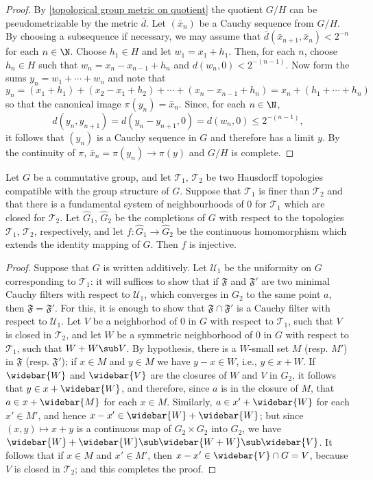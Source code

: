 \begin{proof}
By \cref{topological group metric on quotient} the quotient $G/H$ can be pseudometrizable by the metric $\bar{d}$. Let $(\bar{x}_n)$ be a Cauchy sequence from $G/H$. By choosing a subsequence if necessary, we may assume that $\bar{d}(\bar{x}_{n+1},\bar{x}_n)<2^{-n}$ for each $n\in\N$. Choose $h_1\in H$ and let $w_1=x_1+h_1$. Then, for each $n$, choose $h_n\in H$ such that $w_n=x_n-x_{n-1}+h_n$ and $d(w_n,0)<2^{-(n-1)}$. Now form the sums $y_n=w_1+\cdots+w_n$ and note that
\[y_n=(x_1+h_1)+(x_2-x_1+h_2)+\cdots+(x_{n}-x_{n-1}+h_n)=x_n+(h_1+\cdots+h_n)\]
so that the canonical image $\pi(y_n)=\bar{x}_n$. Since, for each $n\in\N$,
\[d(y_n,y_{n+1})=d(y_n-y_{n+1},0)=d(w_n,0)\leq 2^{-(n-1)},\]
it follows that $(y_n)$ is a Cauchy sequence in $G$ and therefore has a limit $y$. By the continuity of $\pi$, $\bar{x}_n=\pi(y_n)\to\pi(y)$ and $G/H$ is complete.
\end{proof}
\begin{proposition}\label{topological group abelian two topo complete prop}
Let $G$ be a commutative group, and let $\mathcal{T}_1$, $\mathcal{T}_2$ be two Hausdorff topologies compatible with the group structure of $G$. Suppose that $\mathcal{T}_1$ is finer than $\mathcal{T}_2$ and that there is a fundamental system of neighbourhoods of $0$ for $\mathcal{T}_1$ which are closed for $\mathcal{T}_2$. Let $\widehat{G}_1$, $\widehat{G}_2$ be the completions of $G$ with respect to the topologies $\mathcal{T}_1$, $\mathcal{T}_2$, respectively, and let $f:\widehat{G}_1\to\widehat{G}_2$ be the continuous homomorphism which extends the identity mapping of $G$. Then $f$ is injective.
\end{proposition}
\begin{proof}
Suppose that $G$ is written additively. Let $\mathcal{U}_1$ be the uniformity on $G$ corresponding to $\mathcal{T}_1$: it will suffices to show that if $\mathfrak{F}$ and $\mathfrak{F}'$ are two minimal Cauchy filters with respect to $\mathcal{U}_1$, which converges in $G_2$ to the same point $a$, then $\mathfrak{F}=\mathfrak{F}'$. For this, it is enough to show that $\mathfrak{F}\cap\mathfrak{F}'$ is a Cauchy filter with respect to $\mathcal{U}_1$. Let $V$ be a neighborhod of $0$ in $G$ with respect to $\mathcal{T}_1$, such that $V$ is closed in $\mathcal{T}_2$, and let $W$ be a symmetric neighborhood of $0$ in $G$ with respect to $\mathcal{T}_1$, such that $W+W\sub V$. By hypothesis, there is a $W$-small set $M$ (resp. $M'$) in $\mathfrak{F}$ (resp. $\mathfrak{F}'$); if $x\in M$ and $y\in M$ we have $y-x\in W$, i.e., $y\in x+W$. If $\widebar{W}$ and $\widebar{V}$ are the closures of $W$ and $V$ in $G_2$, it follows that $y\in x+\widebar{W}$, and therefore, since $a$ is in the closure of $M$, that $a\in x+\widebar{M}$ for each $x\in M$. Similarly, $a\in x'+\widebar{W}$ for each $x'\in M'$, and hence $x-x'\in\widebar{W}+\widebar{W}$; but since $(x,y)\mapsto x+y$ is a continuous map of $G_2\times G_2$ into $G_2$, we have $\widebar{W}+\widebar{W}\sub\widebar{W+W}\sub\widebar{V}$. It follows that if $x\in M$ and $x'\in M'$, then $x-x'\in\widebar{V}\cap G=V$, because $V$ is closed in $\mathcal{T}_2$; and this completes the proof.
\end{proof}
